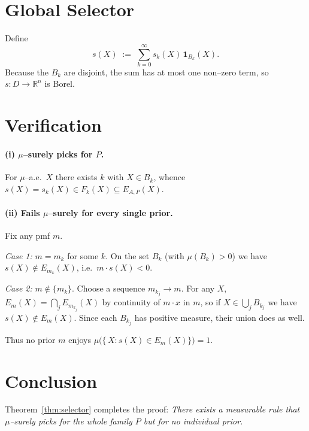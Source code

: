 \documentclass[11pt]{article}
\newcommand{\R}{\mathbb{R}}
\begin{document}
\section{Global Selector}

Define
\[
s(X)\;:=\;\sum_{k=0}^{\infty}s_{k}(X)\,\mathbf 1_{B_{k}}(X).
\]
Because the $B_{k}$ are disjoint, the sum has at most one non--zero term, so $s:D\to\R^{n}$ is Borel.

\section{Verification}

\paragraph{(i) $\mu$--surely picks for $P$.}
For $\mu$--a.e.\ $X$ there exists $k$ with $X\in B_{k}$, whence
$s(X)=s_{k}(X)\in F_{k}(X)\subseteq E_{A,P}(X)$.

\paragraph{(ii) Fails $\mu$--surely for every single prior.}
Fix any pmf $m$.

\smallskip
\emph{Case 1:} $m=m_{k}$ for some $k$.  
On the set $B_{k}$ (with $\mu(B_{k})>0$) we have $s(X)\notin E_{m_{k}}(X)$, i.e.\ $m\cdot s(X)<0$.

\smallskip
\emph{Case 2:} $m\notin\{m_{k}\}$.  
Choose a sequence $m_{k_{j}}\to m$.  
For any $X$, $E_{m}(X)=\bigcap_{j}E_{m_{k_{j}}}(X)$ by continuity of $m\cdot x$ in $m$,
so if $X\in\bigcup_{j}B_{k_{j}}$ we have $s(X)\notin E_{m}(X)$.
Since each $B_{k_{j}}$ has positive measure, their union does as well.

\medskip
Thus no prior $m$ enjoys $\mu\bigl(\{\,X : s(X)\in E_{m}(X)\}\bigr)=1$.

\section{Conclusion}

Theorem~\ref{thm:selector} completes the proof:  
\emph{There exists a measurable rule that $\mu$--surely picks for the whole family $P$ but for no individual prior.} \qedhere
\end{document}

